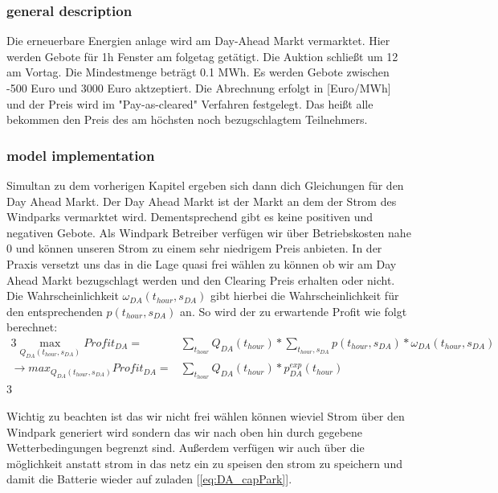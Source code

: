 \subsubsection{general description}

Die erneuerbare Energien anlage wird am Day-Ahead Markt vermarktet. Hier werden Gebote für 1h Fenster am folgetag getätigt.
Die Auktion schließt um 12 am Vortag. Die Mindestmenge beträgt 0.1 MWh. Es werden Gebote zwischen -500 Euro und 3000 Euro aktzeptiert.
Die Abrechnung erfolgt in [Euro/MWh] und der Preis wird im "Pay-as-cleared" Verfahren festgelegt.
Das heißt alle bekommen den Preis des am höchsten noch bezugschlagtem Teilnehmers.

\subsubsection{model implementation}
Simultan zu dem vorherigen Kapitel ergeben sich dann dich Gleichungen für den Day Ahead Markt.
Der Day Ahead Markt ist der Markt an dem der Strom des Windparks vermarktet wird.
Dementsprechend gibt es keine positiven und negativen Gebote. Als Windpark Betreiber
verfügen wir über Betriebskosten nahe 0 und können unseren Strom zu einem sehr niedrigem Preis anbieten.
In der Praxis versetzt uns das in die Lage quasi frei wählen zu können ob wir am Day Ahead Markt bezugschlagt werden
und den Clearing Preis erhalten oder nicht.	Die Wahrscheinlichkeit $\omega_{DA}(t_{hour}, s_{DA})$ gibt hierbei die
Wahrscheinlichkeit für den entsprechenden $p(t_{hour}, s_{DA})$ an. So wird der zu erwartende Profit wie folgt berechnet:\\

\begin{alignat}{3}
	\max_{Q_{DA}(t_{hour}, s_{DA})} Profit_{DA}	=            & \sum_{t_{hour}} Q_{DA}(t_{hour}) * \sum_{t_{hour}, s_{DA}}  p(t_{hour}, s_{DA}) * \omega_{DA}(t_{hour}, s_{DA}) \\
	\rightarrow max_{Q_{DA}(t_{hour}, s_{DA})} Profit_{DA}	= & \sum_{t_{hour}} Q_{DA}(t_{hour}) * p^{exp}_{DA}(t_{hour})
\end{alignat}{3}


Wichtig zu beachten ist das wir nicht frei wählen können wieviel Strom über den Windpark generiert wird
sondern das wir nach oben hin durch gegebene Wetterbedingungen begrenzt sind.
Außerdem verfügen wir auch über die möglichkeit anstatt strom in das netz ein zu speisen den strom zu speichern und damit die
Batterie wieder auf zuladen [\ref{eq:DA_capPark}].


